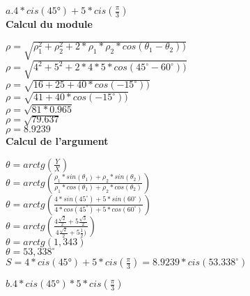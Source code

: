 $a. 4*cis(45°) + 5*cis(\frac{\pi}{3})$\\

\textbf{Calcul du module} \\
\vspace{3mm} %

$\rho = \sqrt{\rho_1^{2}+\rho_2^{2} + 2 * \rho_1 * \rho_2 * cos(\theta_1-\theta_2))}$ \\

$\rho = \sqrt{4^{2}+5^{2} + 2*4*5 * cos(45^{\circ}-60^{\circ}))}$ \\

$\rho = \sqrt{16+25 + 40 * cos(-15^{\circ}))}$ \\

$\rho = \sqrt{41 + 40 * cos(-15^{\circ}))}$ \\

$\rho = \sqrt{81 * 0.965}$ \\

$\rho = \sqrt{79.637}$ \\

$\rho = 8.9239 $ \\

\textbf{Calcul de l'argument} \\
\vspace{3mm} %

$\theta = arctg(\frac{Y}{X})$ \\

$\theta = arctg(\frac{\rho_1 * sin(\theta_1) + \rho_2 * sin(\theta_2)} {\rho_1 * cos(\theta_1) + \rho_2 * cos(\theta_2)})$ \\

$\theta = arctg(\frac{4 * sin(45^{\circ}) + 5 * sin(60^{\circ})} {4 * cos(45^{\circ}) + 5 * cos(60^{\circ})})$ \\

$\theta = arctg(\frac{4\frac{\sqrt{2}} {2} + 5\frac{\sqrt{3}} {2}} {4\frac{\sqrt{2}} {2} + 5\frac{1} {2})})$ \\

$\theta = arctg(1,343)$ \\

$\theta = 53,338^{\circ}$ \\

$ S = 4*cis(45°) + 5*cis(\frac{\pi}{3}) = 8.9239 * cis(53.338^{\circ})$

\newpage

$b. 4*cis(45°) * 5*cis(\frac{\pi}{3})$ \\

